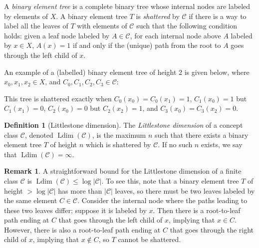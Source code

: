 \documentclass[11pt,a4paper]{amsart}
\theoremstyle{definition}
\newtheorem{definition}{Definition}
\newtheorem{remark}{Remark}
\newcommand{\mc}{\mathcal}
\DeclareMathOperator{\Ldim}{Ldim}
\begin{document}
A \emph{binary element tree} is a complete binary tree whose internal nodes are labeled by elements of $X$. 
A binary element tree $T$ is \emph{shattered} by $\mc C$ if there is a way to label all the leaves of $T$ with elements of $\mc C$ such that the following condition holds: given a leaf node labeled by $A \in \mc C$, for each internal node above $A$ labeled by $x \in X$, $A(x)=1$ if and only if the (unique) path from the root to $A$ goes through the left child of $x$. 

An example of a (labelled) binary element tree of height 2 is given below, where $x_0, x_1, x_2 \in X$, and $C_0, C_1, C_2, C_3 \in \mc C$:

\begin{center}
\end{center}

This tree is shattered exactly when $C_0(x_0) = C_0(x_1) = 1$, $C_1(x_0) = 1$ but $C_1(x_1) = 0$, $C_2(x_0) = 0$ but $C_2(x_2) = 1$, and $C_3(x_0) = C_3(x_2) = 0$.

\begin{definition}[Littlestone dimension]
    The \emph{Littlestone dimension} of a concept class $\mc C$, denoted $\Ldim(\mc C)$, is the maximum $n$ such that there exists a binary element tree $T$ of height $n$ which is shattered by $\mc C$. 
    If no such $n$ exists, we say that $\Ldim(\mc C) = \infty$. 
\end{definition}

\begin{remark} \label{remark:littlestone dimension of a finite class}
    A straightforward bound for the Littlestone dimension of a finite class $\mc C$ is $\Ldim(\mc C) \leq \log |\mc C|$. To see this, note that a binary element tree $T$ of height $>\log |\mc C|$ has more than $|\mc C|$ leaves, so there must be two leaves labeled by the same element $C \in \mc C$. 
    Consider the internal node where the paths leading to these two leaves differ; suppose it is labeled by $x$. 
    Then there is a root-to-leaf path ending at $C$ that goes through the left child of $x$, implying that $x \in C$.
    However, there is also a root-to-leaf path ending at $C$ that goes through the right child of $x$, implying that $x \notin C$, so $T$ cannot be shattered.
\end{remark}
\end{document}
